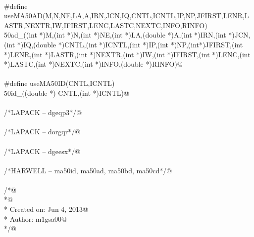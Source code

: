\documentclass[12pt]{article}
\begin{document}
\begin{flushleft}
\begin{minipage}{\linewidth}
\begin{list}{}{}
\mbox{}\verb@@\\
\mbox{}\verb@#define useMA50AD(M,N,NE,LA,A,IRN,JCN,IQ,CNTL,ICNTL,IP,NP,JFIRST,LENR,LASTR,NEXTR,IW,IFIRST,LENC,LASTC,NEXTC,INFO,RINFO)\@\\
\mbox{}\verb@ma50ad_((int *)M,(int *)N,(int *)NE,(int *)LA,(double *)A,(int *)IRN,(int *)JCN,(int *)IQ,(double *)CNTL,(int *)ICNTL,(int *)IP,(int *)NP,(int*)JFIRST,(int *)LENR,(int *)LASTR,(int *)NEXTR,(int *)IW,(int *)IFIRST,(int *)LENC,(int *)LASTC,(int *)NEXTC,(int *)INFO,(double *)RINFO)@\\
\mbox{}\verb@@\\
\mbox{}\verb@#define useMA50ID(CNTL,ICNTL)\@\\
\mbox{}\verb@ma50id_((double *) CNTL,(int *)ICNTL)@\\
\mbox{}\verb@@\\
\mbox{}\verb@/*LAPACK -- dgeqp3*/@\\
\mbox{}\verb@@\\
\mbox{}\verb@/*LAPACK -- dorgqr*/@\\
\mbox{}\verb@@\\
\mbox{}\verb@/*LAPACK -- dgeesx*/@\\
\mbox{}\verb@@\\
\mbox{}\verb@/*HARWELL -- ma50id, ma50ad, ma50bd, ma50cd*/@\\
\mbox{}\verb@@\\
\mbox{}\verb@/*@\\
\mbox{}\verb@ *@\\
\mbox{}\verb@ *  Created on: Jun 4, 2013@\\
\mbox{}\verb@ *      Author: m1gsa00@\\
\mbox{}\verb@ */@\\
\mbox{}\verb@@\\
\mbox{}\verb@@\\
\mbox{}\verb@@\\
\mbox{}\verb@@\\
\mbox{}\verb@@\\
\mbox{}\verb@@\\
\mbox{}\verb@@{\NWsep}
\end{list}
\vspace{-1.5ex}
\footnotesize
\begin{list}{}{\setlength{\itemsep}{-\parsep}\setlength{\itemindent}{-\leftmargin}}

\item{}
\end{list}
\end{minipage}\vspace{4ex}
\end{flushleft}
\appendix
\end{document}
